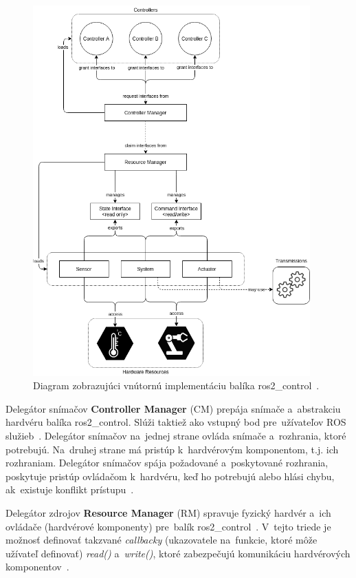 \begin{figure}[!htbp]
	\begin{center}
		\includegraphics[width=0.95\textwidth]{./img/components_architecture.png}
	\end{center}
	\caption{Diagram zobrazujúci vnútornú implementáciu balíka ros2\_control~\cite{roscontrol}.}
	\label{fig:components_architecture}
\end{figure}

Delegátor snímačov \textbf{Controller Manager} (CM) prepája snímače a~abstrakciu hardvéru balíka ros2\_control. Slúži
taktiež ako vstupný bod pre~užívateľov ROS služieb~\cite{roscontrol}.
Delegátor snímačov na~jednej strane ovláda snímače a~rozhrania, ktoré potrebujú. Na~druhej strane má pristúp k~hardvérovým
komponentom, t.j. ich rozhraniam. Delegátor snímačov spája požadované a~poskytované rozhrania, poskytuje pristúp ovládačom
k~hardvéru, keď ho potrebujú alebo hlási chybu, ak~existuje konflikt prístupu~\cite{roscontrol}.

Delegátor zdrojov \textbf{Resource Manager} (RM) spravuje fyzický hardvér a~ich ovládače (hardvérové komponenty)
pre~balík ros2\_control~\cite{roscontrol}. V~tejto triede je možnosť definovať takzvané \textit{callbacky}
(ukazovatele na~funkcie, ktoré môže užívateľ definovať) \textit{read()} a~\textit{write()}, ktoré zabezpečujú
komunikáciu hardvérových komponentov~\cite{roscontrol}.

